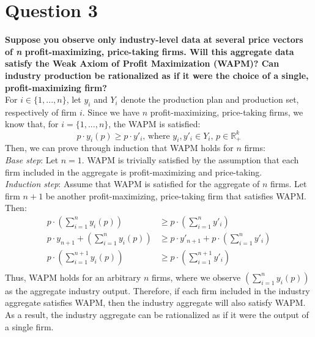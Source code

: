 \documentclass{article}
\newcommand{\R}{\mathbb{R}}
\begin{document}
\section*{Question 3}
\textbf{Suppose you observe only industry-level data at several price vectors of \textit{n} profit-maximizing, price-taking firms. Will this aggregate data satisfy the Weak Axiom of Profit Maximization (WAPM)? Can industry production be rationalized as if it were the choice of a single, profit-maximizing firm?}
\bigskip \\
For $i\in\{1,...,n\}$, let $y_i$ and $Y_i$ denote the production plan and production set, respectively of firm $i$. Since we have $n$ profit-maximizing, price-taking firms, we know that, for $i=\{1,...,n\}$, the WAPM is satisfied:
\[
	p\cdot y_i(p)\geq p\cdot y'_i\text{, where } y_i,y'_i \in Y_i\text{, }p\in\R_+^k
\]
Then, we can prove through induction that WAPM holds for $n$ firms:
\smallskip \\
\indent \textit{Base step}: Let $n=1$. WAPM is trivially satisfied by the assumption that each firm included in the aggregate is profit-maximizing and price-taking.
\smallskip \\
\indent \textit{Induction step}: Assume that WAPM is satisfied for the aggregate of $n$ firms. Let firm $n+1$ be another profit-maximizing, price-taking firm that satisfies WAPM. Then:
\begin{align*}
	p\cdot\left(\sum_{i=1}^{n}y_i(p)\right) 			&\geq p\cdot\left(\sum_{i=1}^{n}y'_i\right)						\\
	p\cdot y_{n+1} + \left(\sum_{i=1}^{n}y_i(p)\right) 	&\geq p\cdot y'_{n+1} + p\cdot\left(\sum_{i=1}^{n}y'_i\right)	\\
	p\cdot\left(\sum_{i=1}^{n+1}y_i(p)\right) 			&\geq p\cdot\left(\sum_{i=1}^{n+1}y'_i\right)					\\
\end{align*}
 Thus, WAPM holds for an arbitrary $n$ firms, where we observe $(\sum_{i=1}^{n}y_i(p))$ as the aggregate industry output. Therefore, if each firm included in the industry aggregate satisfies WAPM, then the industry aggregate will also satisfy WAPM. As a result, the industry aggregate can be rationalized as if it were the output of a single firm.


\end{document}
